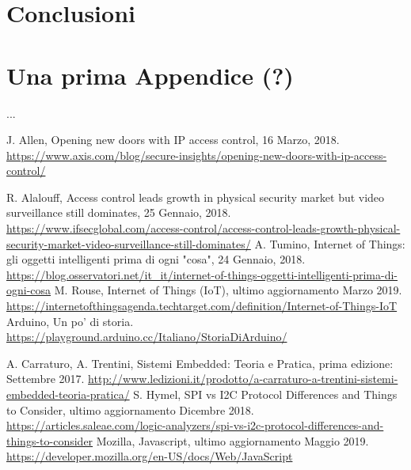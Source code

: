\documentclass[12pt]{report}
\begin{document}
\chapter{Conclusioni}


\label{cap5}
%
%

\appendix
\chapter{Una prima Appendice (?)}
...

%
%
\begin{thebibliography}{00}
	

J. Allen, Opening new doors with IP access control, 16 Marzo, 2018. \url{https://www.axis.com/blog/secure-insights/opening-new-doors-with-ip-access-control/}
%

R. Alalouff, Access control leads growth in physical security market but video surveillance still dominates, 25 Gennaio, 2018.
\url{https://www.ifsecglobal.com/access-control/access-control-leads-growth-physical-security-market-video-surveillance-still-dominates/}
%
A. Tumino, Internet of Things: gli oggetti intelligenti prima di ogni "cosa", 24 Gennaio, 2018.
\url{https://blog.osservatori.net/it_it/internet-of-things-oggetti-intelligenti-prima-di-ogni-cosa}
%
M. Rouse, Internet of Things (IoT), ultimo aggiornamento Marzo 2019.
\url{https://internetofthingsagenda.techtarget.com/definition/Internet-of-Things-IoT}
% 
Arduino, Un po' di storia.
\url{https://playground.arduino.cc/Italiano/StoriaDiArduino/}
%

A. Carraturo, A. Trentini, Sistemi Embedded: Teoria e Pratica, prima edizione: Settembre 2017.
\url{http://www.ledizioni.it/prodotto/a-carraturo-a-trentini-sistemi-embedded-teoria-pratica/}
%
S. Hymel, SPI vs I2C Protocol Differences and Things to Consider, ultimo aggiornamento Dicembre 2018.
\url{https://articles.saleae.com/logic-analyzers/spi-vs-i2c-protocol-differences-and-things-to-consider}
%
Mozilla, Javascript, ultimo aggiornamento Maggio 2019.
\url{https://developer.mozilla.org/en-US/docs/Web/JavaScript}

\end{thebibliography}
%
\end{document}
